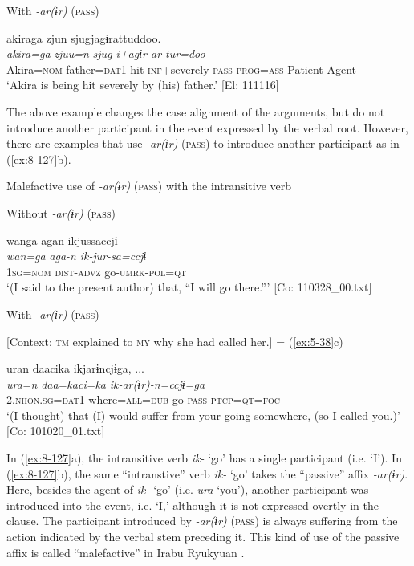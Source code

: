 \ex With \textit{-ar(ɨr)} (\textsc{pass})

{\TM}
\glll  akiraga  zjun  sjugjagɨrattuddoo.\\
\textit{akira=ga}  \textit{zjuu=n}  \textit{sjug-i+agɨr-ar-tur=doo}\\
Akira=\textsc{nom}  father=\textsc{dat1}  hit-\textsc{inf}+severely-\textsc{pass}-\textsc{prog}=\textsc{ass}
      Patient  Agent  \\
\glt ‘Akira is being hit severely by (his) father.’ [El: 111116]
\z
\z

  The above example changes the case alignment of the arguments, but do not introduce another participant in the event expressed by the verbal root. However, there are examples that use \textit{-ar(ɨr)} (\textsc{pass}) to introduce another participant as in (\ref{ex:8-127}b).

\ea\label{ex:8-127}
  Malefactive use of \textit{-ar(ɨr)} (\textsc{pass}) with the intransitive verb

\ea Without \textit{-ar(ɨr)} (\textsc{pass})

{\TM}
\glll  wanga  agan  ikjussaccjɨ\\
\textit{wan=ga}  \textit{aga-n}  \textit{ik-jur-sa=ccjɨ}\\
1\textsc{sg}=\textsc{nom}  \textsc{dist}-\textsc{advz}  go-\textsc{umrk}-\textsc{pol}=\textsc{qt}\\
\glt ‘(I said to the present author) that, “I will go there.”’ [Co: 110328\_00.txt]

\ex With \textit{-ar(ɨr)} (\textsc{pass})

    [Context: \textsc{tm} explained to \textsc{my} why she had called her.] = (\ref{ex:5-38}c)

{\TM}
\glll  uran  daacika  ikjarɨncjɨga, ...\\
\textit{ura=n}  \textit{daa=kaci=ka}  \textit{ik-ar(ɨr)-n=ccjɨ=ga}\\
2.\textsc{nhon}.\textsc{sg}=\textsc{dat1}  where=\textsc{all}=\textsc{dub}  go-\textsc{pass}-\textsc{ptcp}=\textsc{qt}=\textsc{foc}\\
\glt ‘(I thought) that (I) would suffer from your going somewhere, (so I called you.)’ [Co: 101020\_01.txt]
\z
\z

In (\ref{ex:8-127}a), the intransitive verb \textit{ik-} ‘go’ has a single participant (i.e. ‘I’). In (\ref{ex:8-127}b), the same “intranstive” verb \textit{ik-} ‘go’ takes the “passive” affix \textit{-ar(ɨr)}. Here, besides the agent of \textit{ik-} ‘go’ (i.e. \textit{ura} ‘you’), another participant was introduced into the event, i.e. ‘I,’ although it is not expressed overtly in the clause. The participant introduced by \textit{-ar(ɨr)} (\textsc{pass}) is always suffering from the action indicated by the verbal stem preceding it. This kind of use of the passive affix is called “malefactive” in Irabu Ryukyuan \citep[493-498]{Shimoji2008}.

